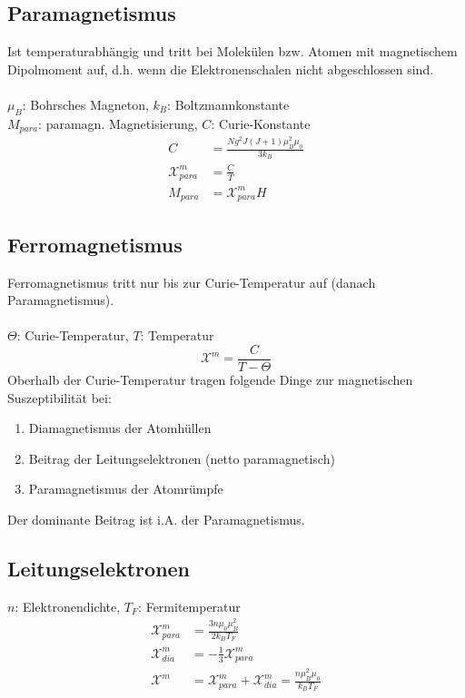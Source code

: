 \documentclass[a4paper,twocolumn,10pt]{article}
\begin{document}
\subsection{Paramagnetismus}
Ist temperaturabhängig und tritt bei Molekülen bzw. Atomen mit magnetischem Dipolmoment auf, d.h. wenn die Elektronenschalen nicht abgeschlossen sind.\\\\
$\mu_B$: Bohrsches Magneton, $k_B$: Boltzmannkonstante\\
$M_{para}$: paramagn. Magnetisierung, $C$: Curie-Konstante
\begin{equation*}
\begin{split}
C&=\frac{Ng^2J(J+1)\mu_B^2\mu_0}{3k_B}\\
\mathcal{X}_{para}^m&=\frac{C}{T}\\
M_{para}&=\mathcal{X}_{para}^mH
\end{split}
\end{equation*}

\subsection{Ferromagnetismus}
Ferromagnetismus tritt nur bis zur Curie-Temperatur auf (danach Paramagnetismus).\\\\
$\Theta$: Curie-Temperatur, $T$: Temperatur
\begin{equation*}
\mathcal{X}^m=\frac{C}{T-\Theta}
\end{equation*}
Oberhalb der Curie-Temperatur tragen folgende Dinge zur magnetischen Suszeptibilität bei:
\begin{enumerate}[label=$\bullet$]
\item Diamagnetismus der Atomhüllen
\item Beitrag der Leitungselektronen (netto paramagnetisch)
\item Paramagnetismus der Atomrümpfe
\end{enumerate}
Der dominante Beitrag ist i.A. der Paramagnetismus.

\subsection{Leitungselektronen}
$n$: Elektronendichte, $T_F$: Fermitemperatur
\begin{equation*}
\begin{split}
\mathcal{X}_{para}^m&=\frac{3n\mu_0\mu_B^2}{2k_BT_F}\\
\mathcal{X}_{dia}^m&=-\frac{1}{3}\mathcal{X}_{para}^m\\
\mathcal{X}^m&=\mathcal{X}_{para}^m+\mathcal{X}_{dia}^m=\frac{n\mu_B^2\mu_0}{k_BT_F}
\end{split}
\end{equation*}
\end{document}
